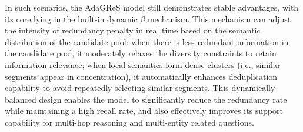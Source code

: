 \documentclass[11pt]{article}
\begin{document}
In such scenarios, the AdaGReS model still demonstrates stable advantages, with its core lying in the built-in dynamic $\beta$ mechanism. This mechanism can adjust the intensity of redundancy penalty in real time based on the semantic distribution of the candidate pool: when there is less redundant information in the candidate pool, it moderately relaxes the diversity constraints to retain information relevance; when local semantics form dense clusters (i.e., similar segments appear in concentration), it automatically enhances deduplication capability to avoid repeatedly selecting similar segments. This dynamically balanced design enables the model to significantly reduce the redundancy rate while maintaining a high recall rate, and also effectively improves its support capability for multi-hop reasoning and multi-entity related questions.
\end{document}
